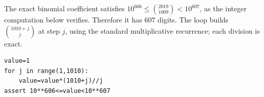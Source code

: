 The exact binomial coefficient satisfies $10^{606}\le\binom{2019}{1009}<10^{607}$, as the integer computation below verifies. Therefore it has $\boxed{607}$ digits. The loop builds $\binom{1010+j}{j}$ at step $j$, using the standard multiplicative recurrence; each division is exact.\begin{verbatim}
value=1
for j in range(1,1010):
    value=value*(1010+j)//j
assert 10**606<=value<10**607
\end{verbatim}
